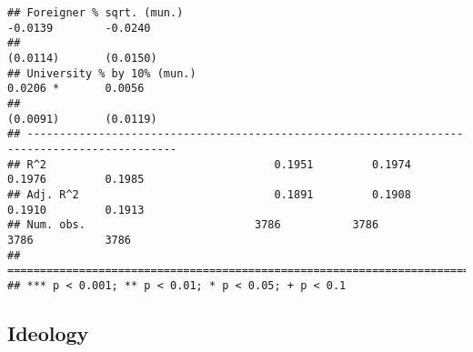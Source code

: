 \documentclass[
]{article}
\begin{document}
\begin{verbatim}
## Foreigner % sqrt. (mun.)                                           -0.0139        -0.0240    
##                                                                    (0.0114)       (0.0150)   
## University % by 10% (mun.)                                          0.0206 *       0.0056    
##                                                                    (0.0091)       (0.0119)   
## ---------------------------------------------------------------------------------------------
## R^2                                   0.1951         0.1974         0.1976         0.1985    
## Adj. R^2                              0.1891         0.1908         0.1910         0.1913    
## Num. obs.                          3786           3786           3786           3786         
## =============================================================================================
## *** p < 0.001; ** p < 0.01; * p < 0.05; + p < 0.1
\end{verbatim}

\hypertarget{ideology-4}{%
\subsection{Ideology}\label{ideology-4}}
\end{document}
